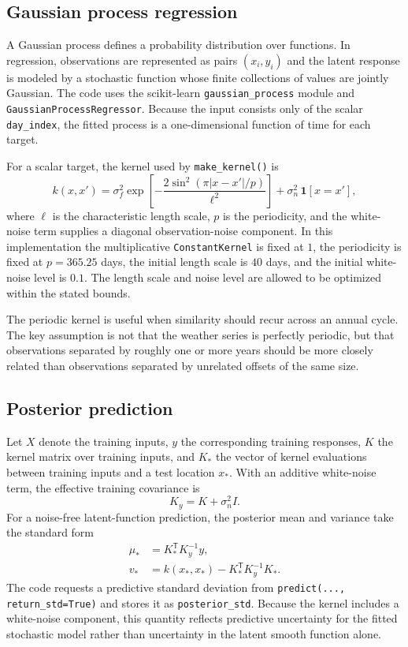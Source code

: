 \documentclass[11pt,a4paper]{article}
\newcommand{\code}[1]{\texttt{#1}}
\begin{document}
\subsection{Gaussian process regression}
A Gaussian process defines a probability distribution over functions. In regression, observations are represented as pairs $(x_i,y_i)$ and the latent response is modeled by a stochastic function whose finite collections of values are jointly Gaussian. The code uses the scikit-learn \code{gaussian\_process} module and \code{GaussianProcessRegressor}. Because the input consists only of the scalar \code{day\_index}, the fitted process is a one-dimensional function of time for each target.

For a scalar target, the kernel used by \code{make\_kernel()} is
\begin{equation}
 k(x,x') = \sigma_f^2 \exp\!\left[-\frac{2\sin^2\!\left(\pi |x-x'|/p\right)}{\ell^2}\right] + \sigma_n^2\,\mathbf{1}[x=x'],
\end{equation}
where $\ell$ is the characteristic length scale, $p$ is the periodicity, and the white-noise term supplies a diagonal observation-noise component. In this implementation the multiplicative \code{ConstantKernel} is fixed at $1$, the periodicity is fixed at $p=365.25$ days, the initial length scale is $40$ days, and the initial white-noise level is $0.1$. The length scale and noise level are allowed to be optimized within the stated bounds.

The periodic kernel is useful when similarity should recur across an annual cycle. The key assumption is not that the weather series is perfectly periodic, but that observations separated by roughly one or more years should be more closely related than observations separated by unrelated offsets of the same size.

\subsection{Posterior prediction}
Let $X$ denote the training inputs, $y$ the corresponding training responses, $K$ the kernel matrix over training inputs, and $K_*$ the vector of kernel evaluations between training inputs and a test location $x_*$. With an additive white-noise term, the effective training covariance is
\begin{equation}
 K_y = K + \sigma_n^2 I.
\end{equation}
For a noise-free latent-function prediction, the posterior mean and variance take the standard form
\begin{align}
 \mu_* &= K_*^{\mathsf T}K_y^{-1}y,\\
 v_* &= k(x_*,x_*) - K_*^{\mathsf T}K_y^{-1}K_*.
\end{align}
The code requests a predictive standard deviation from \code{predict(..., return\_std=True)} and stores it as \code{posterior\_std}. Because the kernel includes a white-noise component, this quantity reflects predictive uncertainty for the fitted stochastic model rather than uncertainty in the latent smooth function alone.
\end{document}
